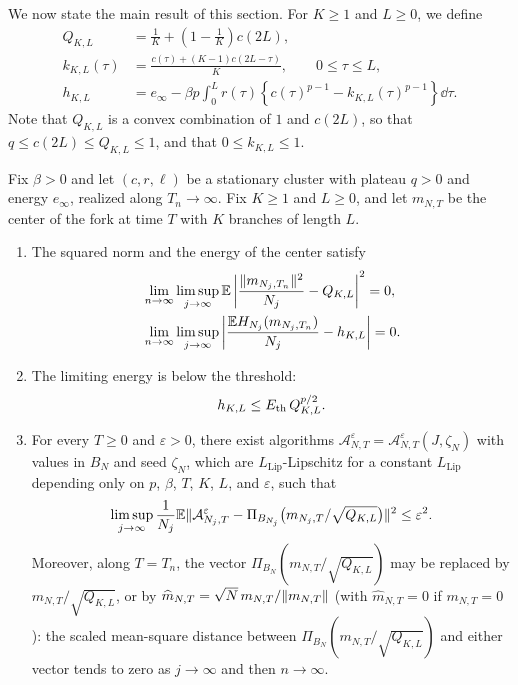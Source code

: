 We now state the main result of this section. For $K\ge1$ and $L\ge0$, we
define
\begin{align}
 Q_{K,L}&=\frac1K+\left(1-\frac1K\right)c(2L),
 \label{sel:fork-norm}\\
 k_{K,L}(\tau)&=\frac{c(\tau)+(K-1)c(2L-\tau)}K,\qquad 0\le\tau\le L,
 \label{sel:fork-mixed-overlap}\\
 h_{K,L}&=e_\infty-\beta p\int_0^Lr(\tau)
 \left\{c(\tau)^{p-1}-k_{K,L}(\tau)^{p-1}\right\}\dd\tau.
 \label{sel:fork-center-energy}
\end{align}
Note that $Q_{K,L}$ is a convex combination of $1$ and $c(2L)$, so that
$q\le c(2L)\le Q_{K,L}\le1$, and that $0\le k_{K,L}\le1$.

\begin{proposition}\label{sel:finite-forks}
Fix $\beta>0$ and let $(c,r,\ell)$ be a stationary cluster with plateau
$q>0$ and energy $e_\infty$, realized along $T_n\to\infty$. Fix $K\ge1$ and
$L\ge0$, and let $m_{N,T}$ be the center of the fork at time $T$ with $K$
branches of length $L$.
\begin{enumerate}[label=(\alph*)]
\item\label{item:fork-limits}
The squared norm and the energy of the center satisfy
\begin{align}
 &\lim_{n\to\infty}\limsup_{j\to\infty}
 \mathbb E\left|\frac{\lVert m_{N_j,T_n}\rVert^2}{N_j}-Q_{K,L}\right|^2=0,
 \label{sel:fork-center-concentration}\\
 &\lim_{n\to\infty}\limsup_{j\to\infty}
 \left|\frac{\mathbb E H_{N_j}(m_{N_j,T_n})}{N_j}-h_{K,L}\right|=0.
 \label{sel:fork-center-energy-limit}
\end{align}
\item\label{item:fork-ceiling}
The limiting energy is below the threshold:
\begin{equation}\label{sel:fork-center-threshold}
 h_{K,L}\le E_{\mathrm{th}}\,Q_{K,L}^{p/2}.
\end{equation}
\item\label{item:fork-lipschitz}
For every $T\ge0$ and $\varepsilon>0$, there exist algorithms
$\mathcal A^\varepsilon_{N,T}=\mathcal A^\varepsilon_{N,T}(J,\zeta_N)$ with
values in $B_N$ and seed $\zeta_N$, which are $L_{\mathrm{Lip}}$-Lipschitz for a
constant $L_{\mathrm{Lip}}$ depending only on $p$, $\beta$, $T$, $K$, $L$, and
$\varepsilon$, such that
\begin{equation}\label{sel:fork-lipschitz}
 \limsup_{j\to\infty}\frac1{N_j}\mathbb E\lVert\mathcal A^\varepsilon_{N_j,T}
 -\Pi_{B_{N_j}}\big(m_{N_j,T}/\sqrt{Q_{K,L}}\big)\rVert^2\le\varepsilon^2.
\end{equation}
Moreover, along $T=T_n$, the vector $\Pi_{B_N}(m_{N,T}/\sqrt{Q_{K,L}})$ may
be replaced by $m_{N,T}/\sqrt{Q_{K,L}}$, or by
$\widehat m_{N,T}=\sqrt N\,m_{N,T}/\lVert m_{N,T}\rVert$ (with $\widehat m_{N,T}=0$
if $m_{N,T}=0$): the scaled mean-square distance between
$\Pi_{B_N}(m_{N,T}/\sqrt{Q_{K,L}})$ and either vector tends to zero as
$j\to\infty$ and then $n\to\infty$.
\end{enumerate}
\end{proposition}

